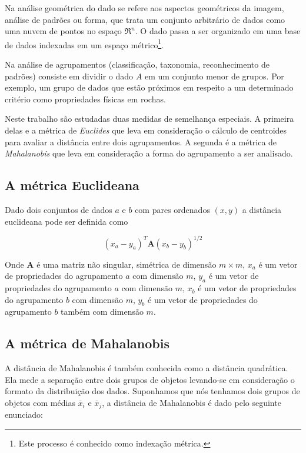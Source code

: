 Na análise geométrica do dado se refere aos aspectos geométricos da imagem, análise de padrões ou forma, que trata um conjunto arbitrário de dados como uma nuvem de pontos no espaço  $\Re ^{n}$. O dado passa a ser organizado em uma base de dados indexadas em um espaço métrico\footnote{Este processo é conhecido como indexação métrica.}.

Na análise de agrupamentos (classificação, taxonomia, reconhecimento de padrões) consiste em dividir o dado $A$ em um conjunto menor de grupos. Por exemplo, um grupo de dados que estão próximos em respeito a um determinado critério como propriedades físicas em rochas. 

Neste trabalho são estudadas duas medidas de semelhança especiais. A primeira delas e a métrica de \textit{Euclides} que leva em consideração o cálculo de centroides para avaliar a distância entre dois agrupamentos. A segunda é a métrica de \textit{Mahalanobis} que leva em consideração a forma do agrupamento a ser analisado.   

\subsection{A métrica Euclideana}
Dado dois conjuntos de dados $a$ e $b$ com pares ordenados $(x,y)$ a distância euclideana pode ser definida como 

\begin{equation}
(x_{a}-y_{a})^{T}\textbf{A}(x_{b}-y_{b})^{1/2}
\end{equation}

Onde $\textbf{A}$ é uma matriz não singular, simétrica de dimensão $m \times m $, $x_{a}$ é um vetor de propriedades do agrupamento $a$ com dimensão $m$, $y_{a}$ é um vetor de propriedades do agrupamento $a$ com dimensão $m$, $x_{b}$ é um vetor de propriedades do agrupamento $b$ com dimensão $m$, $y_{b}$ é um vetor de propriedades do agrupamento $b$ também com dimensão $m$.


\subsection{A métrica de Mahalanobis}

A distância de Mahalanobis é também conhecida como a distância quadrática. Ela mede a separação entre dois grupos de objetos levando-se em consideração o formato da distribuição dos dados. Suponhamos que nós tenhamos dois grupos de objetos com médias $\bar{x}_{i}$ e $\bar{x}_{j}$, a distância de Mahalanobis é dado pelo seguinte enunciado:

